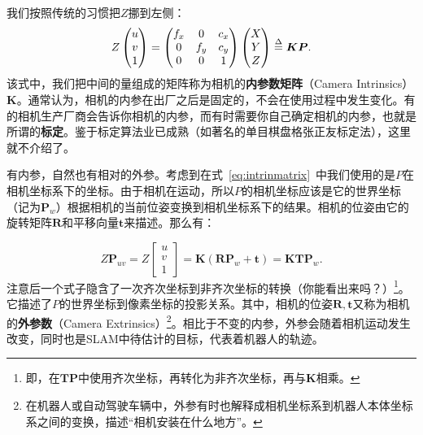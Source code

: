 我们按照传统的习惯把$Z$挪到左侧：
\begin{equation}
Z \begin{pmatrix} u\\ v\\ 1 \end{pmatrix}= \begin{pmatrix} f_x & 0&c_x \\ 0& f_y& c_y\\ 0&0 & 1 \end{pmatrix}\begin{pmatrix} X\\ Y\\ Z \end{pmatrix} 
\buildrel \Delta \over = \bm{K} \bm{P}.
\end{equation}
该式中，我们把中间的量组成的矩阵称为相机的\textbf{内参数矩阵}（Camera Intrinsics）$\bm{K}$。通常认为，相机的内参在出厂之后是固定的，不会在使用过程中发生变化。有的相机生产厂商会告诉你相机的内参，而有时需要你自己确定相机的内参，也就是所谓的\textbf{标定}。鉴于标定算法业已成熟（如著名的单目棋盘格张正友标定法\cite{Zhang1999}），这里就不介绍了。

有内参，自然也有相对的外参。考虑到在式~\eqref{eq:intrinmatrix}~中我们使用的是$P$在相机坐标系下的坐标。由于相机在运动，所以$P$的相机坐标应该是它的世界坐标（记为$\bm{P}_w$）根据相机的当前位姿变换到相机坐标系下的结果。相机的位姿由它的旋转矩阵$\bm{R}$和平移向量$\bm{t}$来描述。那么有：

\begin{equation}
\label{eq:cameraprojection}
Z \bm{P}_{uv}=
Z \left[ \begin{array}{l}
u\\
v\\
1
\end{array} \right] = \bm{K} \left( {\bm{R}{ \bm{P}_w} + \bm{t}} \right) =  \bm{K} \bm{T} \bm{P}_w .
\end{equation}
注意后一个式子隐含了一次齐次坐标到非齐次坐标的转换（你能看出来吗？）\footnote{即，在$\bm{T}\bm{P}$中使用齐次坐标，再转化为非齐次坐标，再与$\bm{K}$相乘。}。它描述了$P$的世界坐标到像素坐标的投影关系。其中，相机的位姿$\bm{R},\bm{t}$又称为相机的\textbf{外参数}（Camera Extrinsics）\footnote{在机器人或自动驾驶车辆中，外参有时也解释成相机坐标系到机器人本体坐标系之间的变换，描述“相机安装在什么地方”。}。相比于不变的内参，外参会随着相机运动发生改变，同时也是SLAM中待估计的目标，代表着机器人的轨迹。
%

